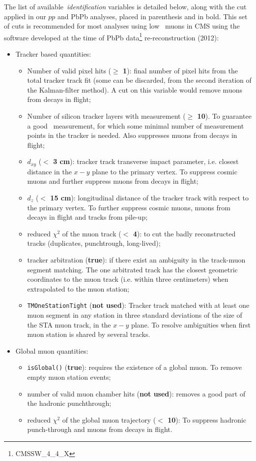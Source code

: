 The list of available~\textit{identification} variables is detailed
below, along with the cut applied in our $pp$ and PbPb analyses,
placed in parenthesis and in bold. This set of cuts is recommended for
most analyses using low \pt\ muons in CMS using the software developed
at the time of PbPb data\footnote{CMSSW\_4\_4\_X}
re-reconstruction (2012): 
\begin{itemize}
\item[1] Tracker based quantities:
  \begin{itemize}
  \item[-] Number of valid pixel hits (\textbf{$\geq$ 1}): final number of pixel hits
    from the total tracker track fit (some can be discarded, from
    the second iteration of the Kalman-filter method). A cut on this
    variable would remove muons from decays in flight;
  \item[-] Number of silicon tracker layers with measurement  (\textbf{$\geq$ 10}). To
    guarantee a good \pt\ measurement, for which some minimal number
    of measurement points in the tracker is needed.
    Also suppresses muons from decays in flight;
  \item[-] $d_{xy}$  (\textbf{$<$ 3 cm}): tracker track transverse impact parameter,
    i.e. closest distance in the $x-y$ plane to the primary vertex. To
    suppress cosmic muons and further suppress muons from decays in
    flight;
  \item[-] $d_{z}$  (\textbf{$<$ 15 cm}):  longitudinal distance of the tracker track with
    respect to the primary vertex. To further suppress cosmic muons,
    muons from decays in flight and tracks from pile-up;
  \item[-] reduced $\chi^{2}$ of the muon track  (\textbf{$<$ 4}): to cut the badly
    reconstructed tracks (duplicates, punchtrough, long-lived);
  \item[-] tracker arbitration  (\textbf{true}): if there exist an ambiguity in the
    track-muon segment matching. The one arbitrated track has the closest geometric
    coordinates to the muon track (i.e. within three centimeters) when
    extrapolated to the muon station;
  \item[-] \verb?TMOneStationTight?  (\textbf{not used}): Tracker track matched with at
    least one muon segment in any station in three standard deviations
    of the size of the STA muon track, in the $x-y$ plane. To resolve
    ambiguities when first muon station is shared by several tracks.
  \end{itemize}
\item[2] Global muon quantities:
  \begin{itemize}
  \item[-] \verb?isGlobal()?  (\textbf{true}): requires the existence of a global
    muon. To remove empty muon station events;
  \item[-] number of valid muon chamber hits  (\textbf{not used}):
    removes a good part of the hadronic punchthrough; 
  \item[-] reduced $\chi^{2}$ of the global muon trajectory  (\textbf{$<$ 10}): To
    suppress hadronic punch-through and muons from decays in flight. 
  \end{itemize}
\end{itemize}
